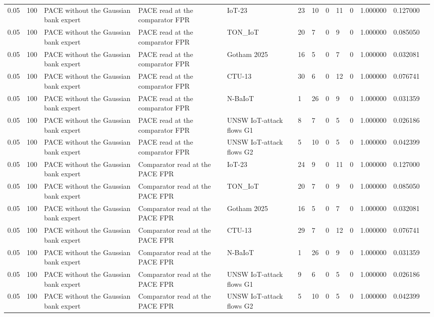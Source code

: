 \begin{tabular}{lllllllllllll}
0.05 & 100 & PACE without the Gaussian bank expert & PACE read at the comparator FPR & IoT-23 & 23 & 10 & 0 & 11 & 0 & 1.000000 & 0.127000 &  \\
0.05 & 100 & PACE without the Gaussian bank expert & PACE read at the comparator FPR & TON\_IoT & 20 & 7 & 0 & 9 & 0 & 1.000000 & 0.085050 &  \\
0.05 & 100 & PACE without the Gaussian bank expert & PACE read at the comparator FPR & Gotham 2025 & 16 & 5 & 0 & 7 & 0 & 1.000000 & 0.032081 &  \\
0.05 & 100 & PACE without the Gaussian bank expert & PACE read at the comparator FPR & CTU-13 & 30 & 6 & 0 & 12 & 0 & 1.000000 & 0.076741 &  \\
0.05 & 100 & PACE without the Gaussian bank expert & PACE read at the comparator FPR & N-BaIoT & 1 & 26 & 0 & 9 & 0 & 1.000000 & 0.031359 &  \\
0.05 & 100 & PACE without the Gaussian bank expert & PACE read at the comparator FPR & UNSW IoT-attack flows G1 & 8 & 7 & 0 & 5 & 0 & 1.000000 & 0.026186 &  \\
0.05 & 100 & PACE without the Gaussian bank expert & PACE read at the comparator FPR & UNSW IoT-attack flows G2 & 5 & 10 & 0 & 5 & 0 & 1.000000 & 0.042399 &  \\
0.05 & 100 & PACE without the Gaussian bank expert & Comparator read at the PACE FPR & IoT-23 & 24 & 9 & 0 & 11 & 0 & 1.000000 & 0.127000 &  \\
0.05 & 100 & PACE without the Gaussian bank expert & Comparator read at the PACE FPR & TON\_IoT & 20 & 7 & 0 & 9 & 0 & 1.000000 & 0.085050 &  \\
0.05 & 100 & PACE without the Gaussian bank expert & Comparator read at the PACE FPR & Gotham 2025 & 16 & 5 & 0 & 7 & 0 & 1.000000 & 0.032081 &  \\
0.05 & 100 & PACE without the Gaussian bank expert & Comparator read at the PACE FPR & CTU-13 & 29 & 7 & 0 & 12 & 0 & 1.000000 & 0.076741 &  \\
0.05 & 100 & PACE without the Gaussian bank expert & Comparator read at the PACE FPR & N-BaIoT & 1 & 26 & 0 & 9 & 0 & 1.000000 & 0.031359 &  \\
0.05 & 100 & PACE without the Gaussian bank expert & Comparator read at the PACE FPR & UNSW IoT-attack flows G1 & 9 & 6 & 0 & 5 & 0 & 1.000000 & 0.026186 &  \\
0.05 & 100 & PACE without the Gaussian bank expert & Comparator read at the PACE FPR & UNSW IoT-attack flows G2 & 5 & 10 & 0 & 5 & 0 & 1.000000 & 0.042399 &  \\

\end{tabular}
